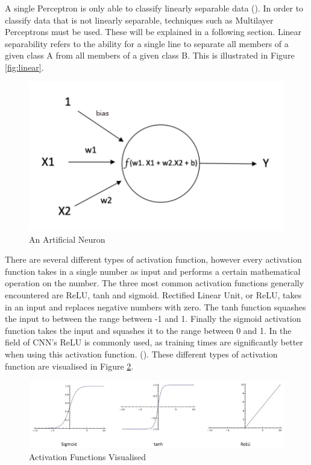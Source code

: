 \documentclass[12pt]{report}
\begin{document}
\begin{flushleft}
A single Perceptron is only able to classify linearly separable data (\cite{kotsiantis2007supervised}). In order to classify data that is not linearly separable, techniques such as Multilayer Perceptrons must be used. These will be explained in a following section. Linear separability refers to the ability for a single line to separate all members of a given class A from all members of a given class B. This is illustrated in Figure \ref{fig:linear}.
\end{flushleft}

\vspace{0.5cm}
\begin{figure}[ht!]
	\centering
	\includegraphics[width=12cm]{neuron}
	\caption{An Artificial Neuron}
	\label{fig:neuron}
\end{figure}

\begin{flushleft}
There are several different types of activation function, however every activation function takes in a single number as input and performs a certain mathematical operation on the number. The three most common activation functions generally encountered are ReLU, tanh and sigmoid. Rectified Linear Unit, or ReLU, takes in an input and replaces negative numbers with zero. The tanh function squashes the input to between the range between -1 and 1. Finally the sigmoid activation function takes the input and squashes it to the range between 0 and 1. In the field of CNN's ReLU is commonly used, as training times are significantly better when using this activation function. (\cite{krizhevsky2012imagenet}). These different types of activation function are visualised in Figure \ref{fig:functions}.
\end{flushleft}

\vspace{0.5cm}
\begin{figure}[ht!]
	\centering
	\includegraphics[width=12cm]{functions}
	\caption{Activation Functions Visualised}
	\label{fig:functions}
\end{figure}
\end{document}
